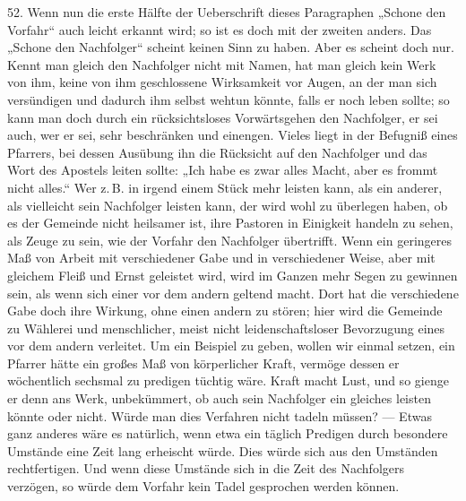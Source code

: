 52. Wenn nun die erste Hälfte der Ueberschrift dieses Paragraphen „Schone den Vorfahr“ auch leicht erkannt wird; so ist es doch mit der zweiten anders. Das „Schone den Nachfolger“ scheint keinen Sinn zu haben. Aber es scheint doch nur. Kennt man gleich den Nachfolger nicht mit Namen, hat man gleich kein Werk von ihm, keine von ihm geschlossene Wirksamkeit vor Augen, an der man sich versündigen und dadurch ihm selbst wehtun könnte, falls er noch leben sollte; so kann man doch durch ein rücksichtsloses Vorwärtsgehen den Nachfolger, er sei auch, wer er sei, sehr beschränken und einengen. Vieles liegt in der Befugniß eines Pfarrers, bei dessen Ausübung ihn die Rücksicht auf den Nachfolger und das Wort des Apostels leiten sollte: „Ich habe es zwar alles Macht, aber es frommt nicht alles.“ Wer z.\,B. in irgend einem Stück mehr leisten kann, als ein anderer, als vielleicht sein Nachfolger leisten kann, der wird wohl zu überlegen haben, ob es der Gemeinde nicht heilsamer ist, ihre Pastoren in Einigkeit handeln zu sehen, als Zeuge zu sein, wie der Vorfahr den Nachfolger übertrifft. Wenn ein geringeres Maß von Arbeit mit verschiedener Gabe und in verschiedener Weise, aber mit gleichem Fleiß
und Ernst geleistet wird, wird im Ganzen mehr Segen zu gewinnen sein, als wenn sich einer vor dem andern geltend macht. Dort hat die verschiedene Gabe doch ihre Wirkung, ohne einen andern zu stören; hier wird die Gemeinde zu Wählerei und menschlicher, meist nicht leidenschaftsloser Bevorzugung eines vor dem andern verleitet. Um ein Beispiel zu geben, wollen wir einmal setzen, ein Pfarrer hätte ein großes Maß von körperlicher Kraft, vermöge dessen er wöchentlich sechsmal zu predigen tüchtig wäre. Kraft macht Lust, und so gienge er denn ans Werk, unbekümmert, ob auch sein Nachfolger ein gleiches leisten könnte oder nicht. Würde man dies Verfahren nicht tadeln müssen? — Etwas ganz anderes wäre es natürlich, wenn etwa ein täglich Predigen durch besondere Umstände eine Zeit lang erheischt würde. Dies würde sich aus den Umständen rechtfertigen. Und wenn diese Umstände sich in die Zeit des Nachfolgers verzögen, so würde dem Vorfahr kein Tadel gesprochen werden können.

